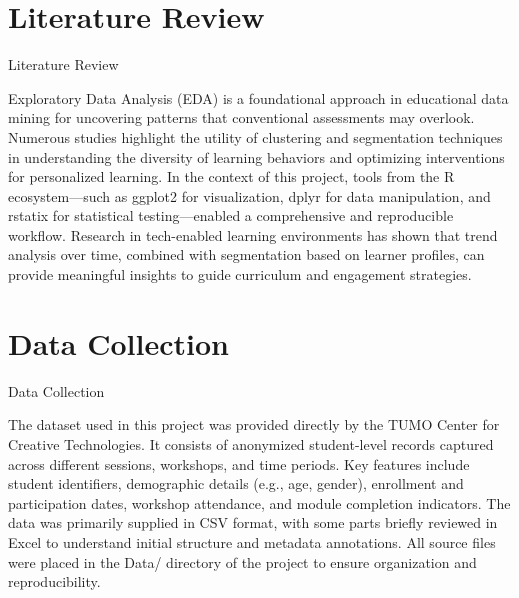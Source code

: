 \documentclass[11pt]{beamer}
\begin{document}
\section{Literature Review}
\begin{frame}{Literature Review}
  \begin{itemize}
    Exploratory Data Analysis (EDA) is a foundational approach in educational data mining for uncovering patterns that conventional assessments may overlook. Numerous studies highlight the utility of clustering and segmentation techniques in understanding the diversity of learning behaviors and optimizing interventions for personalized learning. In the context of this project, tools from the R ecosystem—such as ggplot2 for visualization, dplyr for data manipulation, and rstatix for statistical testing—enabled a comprehensive and reproducible workflow. Research in tech-enabled learning environments has shown that trend analysis over time, combined with segmentation based on learner profiles, can provide meaningful insights to guide curriculum and engagement strategies.
  \end{itemize}
\end{frame}

\section{Data Collection}
\begin{frame}{Data Collection}
  \begin{itemize}
    The dataset used in this project was provided directly by the TUMO Center for Creative Technologies. It consists of anonymized student-level records captured across different sessions, workshops, and time periods. Key features include student identifiers, demographic details (e.g., age, gender), enrollment and participation dates, workshop attendance, and module completion indicators. The data was primarily supplied in CSV format, with some parts briefly reviewed in Excel to understand initial structure and metadata annotations. All source files were placed in the Data/ directory of the project to ensure organization and reproducibility.
  \end{itemize}
\end{frame}

\end{document}
